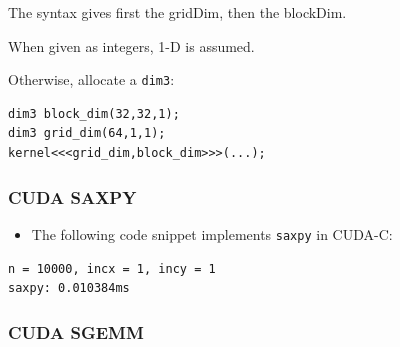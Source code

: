 \begin{Shaded}
\begin{Highlighting}[]

         \NormalTok{+ }\NormalTok{, }
\end{Highlighting}
\end{Shaded}

The syntax gives first the gridDim, then the blockDim.

When given as integers, 1-D is assumed.

Otherwise, allocate a \texttt{dim3}:

\begin{verbatim}
dim3 block_dim(32,32,1);
dim3 grid_dim(64,1,1);
kernel<<<grid_dim,block_dim>>>(...);
\end{verbatim}

\subsubsection{CUDA SAXPY}\label{cuda-saxpy}

\begin{itemize}
\itemsep1pt\parskip0pt
\item
  The following code snippet implements \texttt{saxpy} in CUDA-C:
\end{itemize}

\begin{Shaded}
\begin{Highlighting}[]

      
                        
      
     
\NormalTok{\}}
\end{Highlighting}
\end{Shaded}

\begin{verbatim}
n = 10000, incx = 1, incy = 1
saxpy: 0.010384ms
\end{verbatim}

\subsubsection{CUDA SGEMM}\label{cuda-sgemm}

